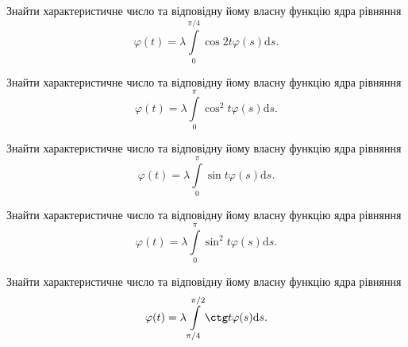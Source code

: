 \documentclass[12pt]{extarticle}
\begin{document}
\begin{Exercise}
Знайти характеристичне число та відповідну йому власну функцію ядра рівняння \[\varphi(t) = \lambda\int\limits_{0}^{\pi/4} \cos 2t \varphi(s) \mathrm{d}s.\]
\end{Exercise}

\begin{Exercise}
Знайти характеристичне число та відповідну йому власну функцію ядра рівняння \[\varphi(t) = \lambda\int\limits_{0}^{\pi} \cos^2 t \varphi(s) \mathrm{d}s.\]
\end{Exercise}

\begin{Exercise}
Знайти характеристичне число та відповідну йому власну функцію ядра рівняння \[\varphi(t) = \lambda\int\limits_{0}^{\pi} \sin t \varphi(s) \mathrm{d}s.\]
\end{Exercise}

\begin{Exercise}
Знайти характеристичне число та відповідну йому власну функцію ядра рівняння \[\varphi(t) = \lambda\int\limits_{0}^{\pi} \sin^2 t \varphi(s) \mathrm{d}s.\]
\end{Exercise}

\begin{Exercise}
Знайти характеристичне число та відповідну йому власну функцію ядра рівняння \[\varphi(t) = \lambda\int\limits_{\pi/4}^{\pi/2} \ctg t \varphi(s) \mathrm{d}s.\]
\end{Exercise}
\end{document}
